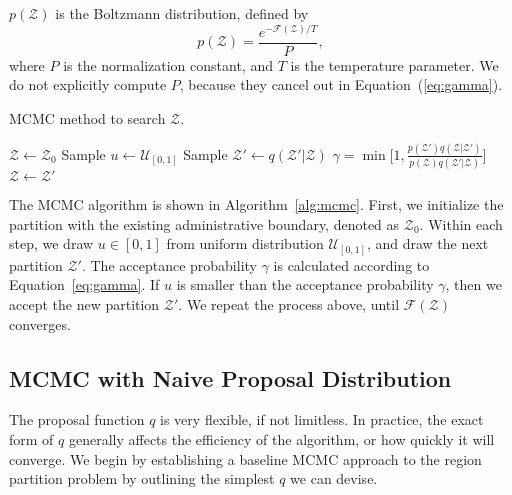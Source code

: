 $p(\mathcal{Z})$ is the Boltzmann distribution, defined by
\begin{equation}
p(\mathcal{Z}) = \frac{e^{-\mathcal{F}(\mathcal{Z})/T}}{P}, 
\label{eq:boltzmann}
\end{equation}
where $P$ is the normalization constant, and $T$ is the temperature parameter. We do not explicitly compute $P$, because they cancel out in Equation~(\ref{eq:gamma}).

\begin{algorithm}
\caption{MCMC method to search $\mathcal{Z}$.}
\label{alg:mcmc}
\begin{algorithmic}[1]
\State $\mathcal{Z} \gets \mathcal{Z}_0$
  \State Sample $u \gets \mathcal{U}_{[0,1]}$
  \State Sample $\mathcal{Z}' \gets q(\mathcal{Z}'|\mathcal{Z})$
  \State $\gamma = \min \Big [ 1, \frac{p(\mathcal{Z}')q(\mathcal{Z}| \mathcal{Z}')}{p(\mathcal{Z})q(\mathcal{Z}'|\mathcal{Z})} \Big ]$
    \State $\mathcal{Z} \gets \mathcal{Z}'$
  \EndIf
\EndWhile
\end{algorithmic}
\end{algorithm}

The MCMC algorithm is shown in Algorithm~\ref{alg:mcmc}. First, we initialize the partition with the existing administrative boundary, denoted as $\mathcal{Z}_0$. Within each step, we draw $u \in [0,1]$ from uniform distribution $\mathcal{U}_{[0,1]}$, and draw the next partition $\mathcal{Z}'$. The acceptance probability $\gamma$ is calculated according to Equation~\ref{eq:gamma}. If $u$ is smaller than the acceptance probability $\gamma$, then we accept the new partition $\mathcal{Z}'$. We repeat the process above, until $\mathcal{F}(\mathcal{Z})$ converges.



\subsection{MCMC with Naive Proposal Distribution}

The proposal function $q$ is very flexible, if not limitless. In practice, the exact form of $q$ generally affects the efficiency of the algorithm, or how quickly it will converge. We begin by establishing a baseline MCMC approach to the region partition problem by outlining the simplest $q$ we can devise. 

